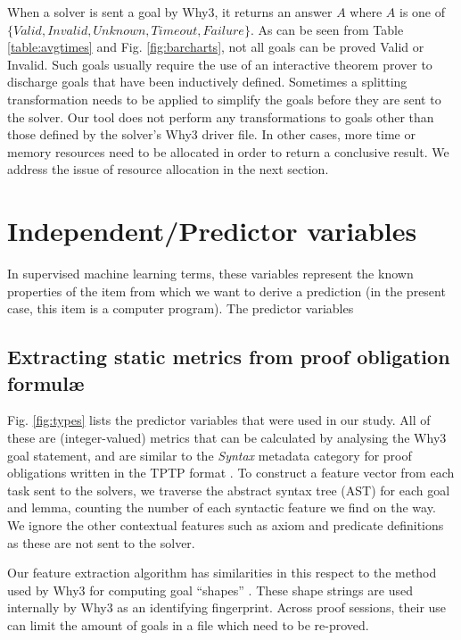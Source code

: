 When a solver is sent a goal by \textsf{Why3}, it returns an answer $A$ where $A$ is one of $\lbrace Valid,Invalid,Unknown,Timeout,Failure \rbrace$. As can be seen from Table \ref{table:avgtimes} and Fig. \ref{fig:barcharts}, not all goals can be proved Valid or Invalid. Such goals usually require the use of an interactive theorem prover to discharge goals that have been inductively defined. Sometimes a splitting transformation needs to be applied to simplify the goals before they are sent to the solver. Our tool does not perform any transformations to goals other than those defined by the solver's \textsf{Why3} driver file. In other cases, more time or memory resources need to be allocated in order to return a conclusive result. We address the issue of resource allocation in the next section.     

\section{Independent/Predictor variables}
\label{sec:independant}

In supervised machine learning terms, these variables represent the known properties of the item from which we want to derive a prediction (in the present case, this item is a computer program). 
The predictor variables  

\subsection{Extracting static metrics from \why proof obligation formul\ae}
\label{sub:extracting}

Fig. \ref{fig:types} lists the predictor variables that were used in our study.  All of these are (integer-valued) metrics that can be calculated by analysing the \textsf{Why3} goal statement, and are similar to the \textit{Syntax} metadata category for proof obligations written in the TPTP format \cite{TPTP}. To construct a feature vector from each task sent to the solvers, we traverse the abstract syntax tree (AST) for each goal and lemma, counting the number of each syntactic feature we find on the way. We ignore the other contextual features such as axiom and predicate definitions as these are not sent to the solver. 

Our feature extraction algorithm has similarities in this respect to the method used by \textsf{Why3} for computing goal ``shapes'' \cite{why:preserving}. These shape strings are used internally by \textsf{Why3} as an identifying fingerprint. Across proof sessions, their use can limit the amount of goals in a file which need to be re-proved.   

